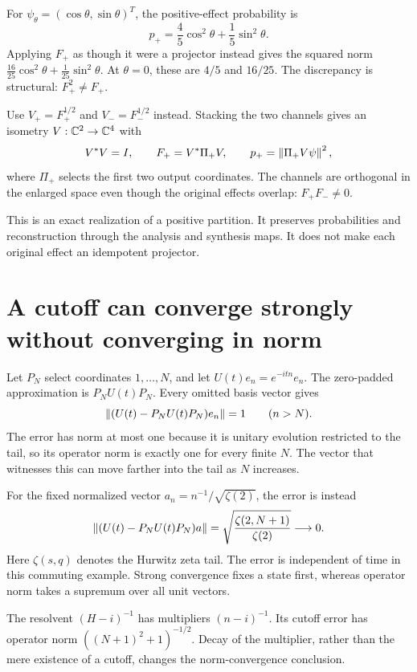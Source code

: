 For $\psi_\theta=(\cos\theta,\sin\theta)^T$, the positive-effect probability is
\[
p_+=\frac45\cos^2\theta+\frac15\sin^2\theta.
\]
Applying $F_+$ as though it were a projector instead gives the squared norm $\frac{16}{25}\cos^2\theta+\frac1{25}\sin^2\theta$. At $\theta=0$, these are $4/5$ and $16/25$. The discrepancy is structural: $F_+^2\ne F_+$.

Use $V_+=F_+^{1/2}$ and $V_-=F_-^{1/2}$ instead. Stacking the two channels gives an isometry $V:\mathbb C^2\to\mathbb C^4$ with
\[
V^*V=I,\qquad F_+=V^*\Pi_+V,\qquad
p_+=\left\lVert\Pi_+V\psi\right\rVert^2,
\]
where $\Pi_+$ selects the first two output coordinates. The channels are orthogonal in the enlarged space even though the original effects overlap: $F_+F_-\ne0$.

This is an exact realization of a positive partition. It preserves probabilities and reconstruction through the analysis and synthesis maps. It does not make each original effect an idempotent projector.



\clearpage
\section{A cutoff can converge strongly without converging in norm}

Let $P_N$ select coordinates $1,\ldots,N$, and let $U(t)e_n=e^{-itn}e_n$. The zero-padded approximation is $P_NU(t)P_N$. Every omitted basis vector gives
\[
\left\lVert(U(t)-P_NU(t)P_N)e_n\right\rVert=1\qquad(n>N).
\]
The error has norm at most one because it is unitary evolution restricted to the tail, so its operator norm is exactly one for every finite $N$. The vector that witnesses this can move farther into the tail as $N$ increases.

For the fixed normalized vector $a_n=n^{-1}/\sqrt{\zeta(2)}$, the error is instead
\[
\left\lVert(U(t)-P_NU(t)P_N)a\right\rVert
=\sqrt{\frac{\zeta(2,N+1)}{\zeta(2)}}\longrightarrow0.
\]
Here $\zeta(s,q)$ denotes the Hurwitz zeta tail. The error is independent of time in this commuting example. Strong convergence fixes a state first, whereas operator norm takes a supremum over all unit vectors.

The resolvent $(H-i)^{-1}$ has multipliers $(n-i)^{-1}$. Its cutoff error has operator norm $((N+1)^2+1)^{-1/2}$. Decay of the multiplier, rather than the mere existence of a cutoff, changes the norm-convergence conclusion.



